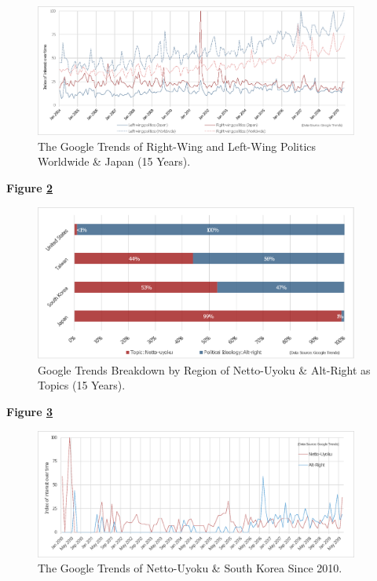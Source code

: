 \documentclass[10pt,british,A4paper,,openany]{memoir}
\begin{document}
\begin{figure}[!htb]
 \caption{\label{fig:politictrends} The Google Trends of Right-Wing and Left-Wing Politics Worldwide \& Japan (15 Years).}
 \centering 
 \includegraphics[width=0.95\textwidth,trim=4 4 4 4,clip]{images/politictrends.eps}
\end{figure}

\textbf{Figure \ref{fig:netto-altright}}

\begin{figure}[!htb]
 \caption{\label{fig:netto-altright} Google Trends Breakdown by Region of Netto-Uyoku \& Alt-Right as Topics (15 Years).}
 \centering
 \includegraphics[width=0.95\textwidth,trim=4 4 4 4,clip]{images/netto-altright.eps}
\end{figure}

\textbf{Figure \ref{fig:netto-altright-kor}}

\begin{figure}[!htb]
 \caption{\label{fig:netto-altright-kor} The Google Trends of Netto-Uyoku \& South Korea Since 2010.}
 \centering
 \includegraphics[width=0.95\textwidth,trim=4 4 4 4,clip]{images/netto-altright-kor.eps}
\end{figure}
\end{document}
